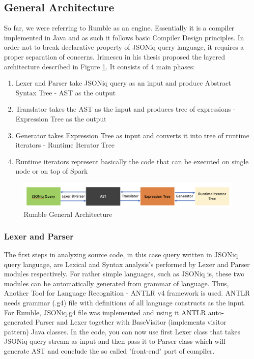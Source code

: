 \subsection{General Architecture}
So far, we were referring to Rumble as an engine. Essentially it is a compiler implemented in Java and as such it follows basic Compiler Design principles. In order not to break declarative property of JSONiq query language, it requires a proper separation of concerns. Irimescu in his thesis \cite{RumbleThesis} proposed the layered architecture described in Figure \ref{fig:Rumble_General_Architecture}. It consists of 4 main phases:
\begin{enumerate}
	\item Lexer and Parser take JSONiq query as an input and produce Abstract Syntax Tree - AST as the output 
	\item Translator takes the AST as the input and produces tree of expressions - Expression Tree as the output
	\item Generator takes Expression Tree as input and converts it into tree of runtime iterators - Runtime Iterator Tree
	\item Runtime iterators represent basically the code that can be executed on single node or on top of Spark
\end{enumerate} 

\begin{figure}[h!]
	\includegraphics[width=\linewidth]{parsing_architecture.png}
	\vspace*{-5mm}
	\caption{Rumble General Architecture}
	\label{fig:Rumble_General_Architecture}
\end{figure}

\subsubsection{Lexer and Parser}
The first steps in analyzing source code, in this case query written in JSONiq query language, are Lexical and Syntax analysis's performed by Lexer and Parser modules respectively. For rather simple languages, such as JSONiq is, these two modules can be automatically generated from grammar of language. Thus, Another Tool for Language Recognition - ANTLR v4 framework \cite{ANTLR} is used. ANTLR needs grammar (.g4) file with definitions of all language constructs as the input. For Rumble, JSONiq.g4 file was implemented and using it ANTLR auto-generated Parser and Lexer together with BaseVisitor (implements visitor pattern) Java classes. In the code, you can now use first Lexer class that takes JSONiq query stream as input and then pass it to Parser class which will generate AST and conclude the so called "front-end" part of compiler.

